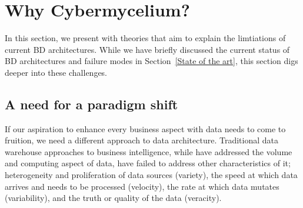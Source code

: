\documentclass{bmcart}
\begin{document}

        

                




\section{Why Cybermycelium?} \label{theory-section}

In this section, we present with theories that aim to explain the limtiations of current BD architectures. While we have briefly discussed the current status of BD architectures and failure modes in Section~\ref{State of the art}, this section digs deeper into these challenges. 

\subsection{A need for a paradigm shift} \label{need for paradigm shift}

If our aspiration to enhance every business aspect with data needs to come to fruition, we need a different approach to data architecture. Traditional data warehouse approaches to business intelligence, while have addressed the volume and computing aspect of data, have failed to address other characteristics of it; heterogeneity and proliferation of data sources (variety), the speed at which data arrives and needs to be processed (velocity), the rate at which data mutates (variability), and the truth or quality of the data (veracity).
\end{document}
